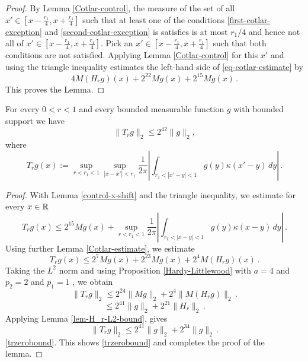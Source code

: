 {\begin{proof}
By Lemma \ref{Cotlar-control}, the measure of the set
of all $x'\in
[x-\frac{r_1}4,x+\frac{r_1}4]$
such that at least one of the conditions
\eqref{first-cotlar-exception} and
\eqref{second-cotlar-exception} is satisfies is at most $r_1/4$ and hence not all of
 $x'\in
[x-\frac{r_1}4,x+\frac{r_1}4]$. Pick an
$x'\in
[x-\frac{r_1}4,x+\frac{r_1}4]$ such that both conditions are not satisfied.
Applying Lemma \ref{Cotlar-control}
for this $x'$ and using the triangle inequality
estimates the left-hand side of \eqref{eq-cotlar-estimate}
by
\begin{equation}
    4M(H_rg)(x)+2^{22}Mg(x)+2^{15}Mg(x)\, .
\end{equation}
This proves the Lemma.
\end{proof}

\begin{lemma}\label{simple-nontangential-Hilbert}
    For every  $0<r<1$ and every bounded measurable function $g$ with bounded support we have
\begin{equation}\label{trzerobound}
    \|T_{r}g\|_2\le 2^{42}\|g\|_2,
\end{equation}
where
\begin{equation}\label{eq-simple--nontangential}
    T_{r} g(x):=\sup_{r<r_1<1}\sup_{|x-x'|<r_1}\frac 1{2\pi} \left|\int_{r_1<|x'-y|<1}
g(y) \kappa(x'-y)\, dy\right|\, .
\end{equation}
\end{lemma}
\begin{proof}
With Lemma \ref{control-x-shift}
and the triangle inequality, we estimate
for every $x\in {\mathbb{R}}$
\begin{equation}
     T_{r} g(x)
     \le 2^{15} Mg(x)+\sup_{r<r_1<1}
     \frac 1{2\pi} \left|\int_{r_1<|x-y|<1}
g(y) \kappa(x-y)\, dy\right|\, .
\end{equation}
Using further Lemma \ref{Cotlar-estimate},
we estimate
\begin{equation}
      T_{r} g(x)
     \le 2^7 Mg(x)+2^{23}
     Mg(x)+2^{4}M(H_{r}g)(x)\, .
\end{equation}
Taking the $L^2$ norm and using Proposition \ref{Hardy-Littlewood} with $a=4$  and $p_2=2$ and $p_1=1$ , we obtain
\begin{equation}
      \|T_{r} g\|_2
     \le 2^{24} \|Mg\|_2+2^{4}\|M(H_{r}g)\|_2\, .
\end{equation}
\begin{equation}
     \le 2^{41} \|g\|_2+2^{21}\|H_{r}\|_2\, .
\end{equation}
Applying Lemma \ref{lem-H_r-L2-bound}, gives
\begin{equation}
      \|T_{r} g\|_2\le 2^{41} \|g\|_2+2^{34}\|g\|_2\, .
\end{equation}
\eqref{trzerobound}.
This shows \eqref{trzerobound} and completes the proof of the lemma.
\end{proof}

}
